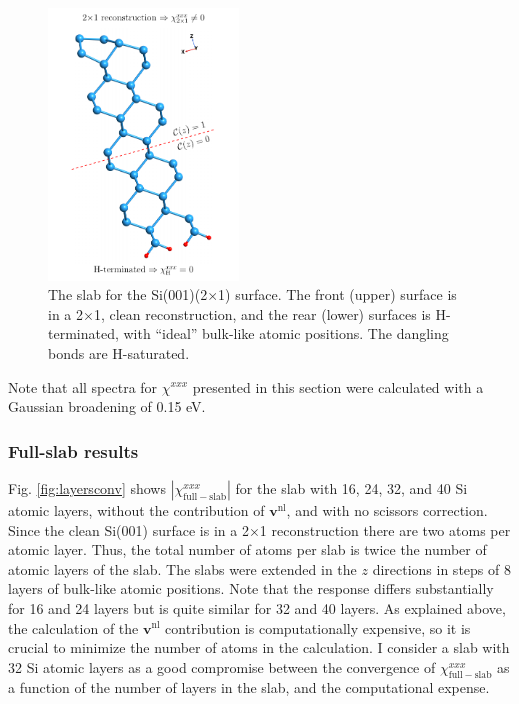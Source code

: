 \begin{figure}[t]
\centering 
\includegraphics[width=0.45\textwidth]{content/figures/struc-Si2x1-rot}
\caption{The slab for the Si(001)(2$\times$1) surface. The front (upper) surface
is in a 2$\times$1, clean reconstruction, and the rear (lower) surfaces is
H-terminated, with ``ideal'' bulk-like atomic positions. The dangling bonds are
H-saturated.}
\label{fig:si2x1slab}
\end{figure} 

Note that all spectra for $\chi^{xxx}$ presented in this section were calculated
with a Gaussian broadening of 0.15 eV.



\subsubsection{Full-slab results}\label{sec:fsresults}

Fig. \ref{fig:layersconv} shows $|\chi_{\mathrm{full-slab}}^{xxx}|$ for the slab
with 16, 24, 32, and 40 Si atomic layers, without the contribution of
$\mathbf{v}^{\mathrm{nl}}$, and with no scissors correction. Since the clean
Si(001) surface is in a 2$\times$1 reconstruction there are two atoms per atomic
layer. Thus, the total number of atoms per slab is twice the number of atomic
layers of the slab. The slabs were extended in the $z$ directions in steps of 8
layers of bulk-like atomic positions. Note that the response differs
substantially for 16 and 24 layers but is quite similar for 32 and 40 layers. As
explained above, the calculation of the $\mathbf{v}^\mathrm{nl}$ contribution is
computationally expensive, so it is crucial to minimize the number of atoms in
the calculation. I consider a slab with 32 Si atomic layers as a good compromise
between the convergence of $\chi^{xxx}_{\mathrm{full-slab}}$ as a function of
the number of layers in the slab, and the computational expense.

